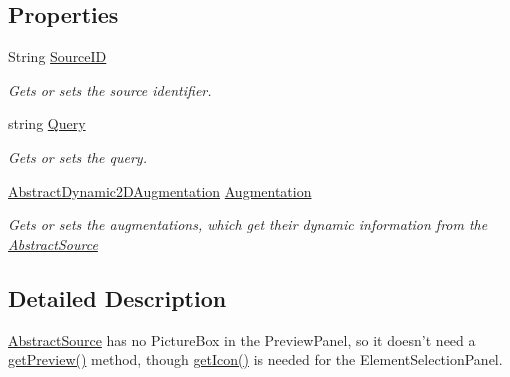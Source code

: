 \subsection*{Properties}
\begin{DoxyCompactItemize}
\item 
String \hyperlink{class_a_rdev_kit_1_1_model_1_1_project_1_1_abstract_source_ad17fdcfdfb0b52e0a2780e7117fd9ffc}{Source\-I\-D}
\begin{DoxyCompactList}\small\item\em Gets or sets the source identifier. \end{DoxyCompactList}\item 
string \hyperlink{class_a_rdev_kit_1_1_model_1_1_project_1_1_abstract_source_a77b9039615be2c2792e6f6792f0d32bc}{Query}
\begin{DoxyCompactList}\small\item\em Gets or sets the query. \end{DoxyCompactList}\item 
\hyperlink{class_a_rdev_kit_1_1_model_1_1_project_1_1_abstract_dynamic2_d_augmentation}{Abstract\-Dynamic2\-D\-Augmentation} \hyperlink{class_a_rdev_kit_1_1_model_1_1_project_1_1_abstract_source_a97697e9bd1d99e0c8a35f47a19568016}{Augmentation}
\begin{DoxyCompactList}\small\item\em Gets or sets the augmentations, which get their dynamic information from the \hyperlink{class_a_rdev_kit_1_1_model_1_1_project_1_1_abstract_source}{Abstract\-Source} \end{DoxyCompactList}\end{DoxyCompactItemize}


\subsection{Detailed Description}
\hyperlink{class_a_rdev_kit_1_1_model_1_1_project_1_1_abstract_source}{Abstract\-Source} has no Picture\-Box in the Preview\-Panel, so it doesn't need a \hyperlink{class_a_rdev_kit_1_1_model_1_1_project_1_1_abstract_source_abd9f742efb27a1fca992f6627c0421e4}{get\-Preview()} method, though \hyperlink{class_a_rdev_kit_1_1_model_1_1_project_1_1_abstract_source_ae698f1c9d55cc0603931bd2804d0c35d}{get\-Icon()} is needed for the Element\-Selection\-Panel. 

